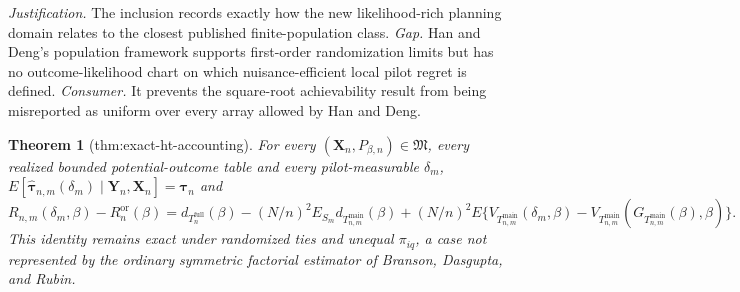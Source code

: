 \documentclass{article}
\newtheorem{theorem}{Theorem}
\begin{document}
\par\smallskip\noindent \textit{Justification.} The inclusion records exactly how the new likelihood-rich planning domain relates to the closest published finite-population class. \textit{Gap.} Han and Deng's population framework supports first-order randomization limits but has no outcome-likelihood chart on which nuisance-efficient local pilot regret is defined. \textit{Consumer.} It prevents the square-root achievability result from being misreported as uniform over every array allowed by Han and Deng.

\begin{theorem}[thm:exact-ht-accounting]\label{thm:exact-ht-accounting}
For every \((\mathbf X_n,P_{\beta,n})\in\mathfrak M\), every realized bounded potential-outcome table and every pilot-measurable \(\delta_m\), \(E[\widehat{\boldsymbol\tau}_{n,m}(\delta_m)\mid\mathbf Y_n,\mathbf X_n]=\boldsymbol\tau_n\) and \[R_{n,m}(\delta_m,\beta)-R_n^{\mathrm{or}}(\beta)=d_{T_n^{\mathrm{full}}}(\beta)-(N/n)^2E_{S_m}d_{T_{n,m}^{\mathrm{main}}}(\beta)+(N/n)^2E\{V_{T_{n,m}^{\mathrm{main}}}(\delta_m,\beta)-V_{T_{n,m}^{\mathrm{main}}}(G_{T_{n,m}^{\mathrm{main}}}(\beta),\beta)\}.\] This identity remains exact under randomized ties and unequal \(\pi_{iq}\), a case not represented by the ordinary symmetric factorial estimator of Branson, Dasgupta, and Rubin.
\end{theorem}
\end{document}
